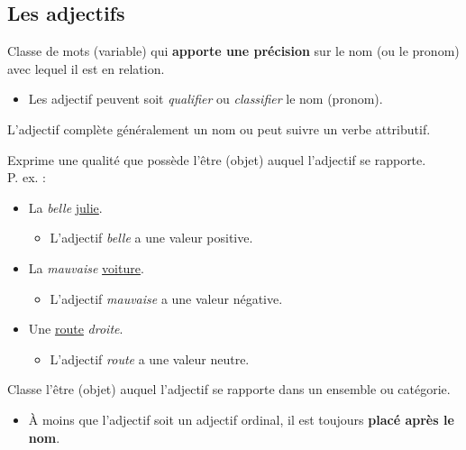 \documentclass[10pt, french]{article}
\begin{document}
\begin{multicols*}{2}
\subsection{Les adjectifs}\label{sec:classes-adj}
\begin{definitionNOHFILL}[L'adjectif]
Classe de mots (variable) qui \textbf{apporte une précision} sur le nom (ou le pronom) avec lequel il est en relation.
\begin{itemize}
	\item	Les adjectif peuvent soit \textit{qualifier} ou \textit{classifier} le nom (pronom).
\end{itemize}
\begin{astuces}
L'adjectif complète généralement un nom ou peut suivre un verbe attributif.
\end{astuces}
\end{definitionNOHFILL}

\begin{definitionNOHFILLsub}
Exprime une qualité que possède l'être (objet) auquel l'adjectif se rapporte.	\\

P. ex. : 
\begin{itemize}
	\item	La \textit{belle} \underline{julie}.
		\begin{itemize}
		\item	L'adjectif \textit{belle} a une valeur positive.
		\end{itemize}
	\item	La \textit{mauvaise} \underline{voiture}.
		\begin{itemize}
		\item	L'adjectif \textit{mauvaise} a une valeur négative.
		\end{itemize}
	\item	Une \underline{route} \textit{droite}.
		\begin{itemize}
		\item	L'adjectif \textit{route} a une valeur neutre.
		\end{itemize}
\end{itemize}

\end{definitionNOHFILLsub}


\begin{definitionNOHFILLsub}
Classe l'être (objet) auquel l'adjectif se rapporte dans un ensemble ou catégorie.
\begin{itemize}
	\item	À moins que l'adjectif soit un adjectif ordinal, il est toujours \textbf{placé après le nom}.
\end{itemize}


\end{definitionNOHFILLsub}
\end{multicols*}
\end{document}
